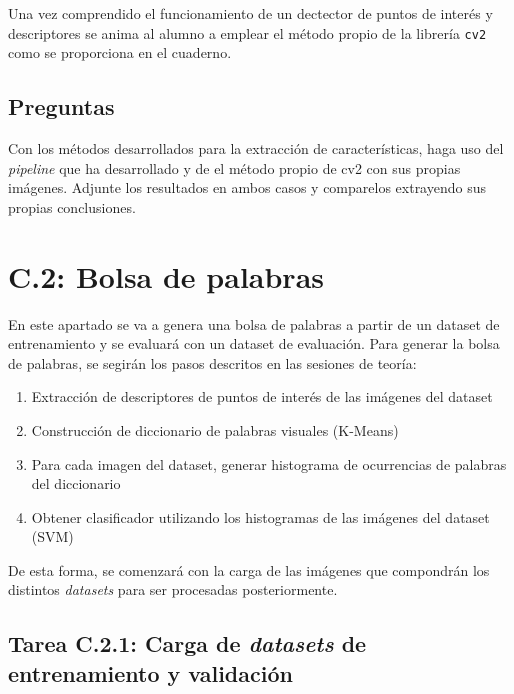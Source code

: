 Una vez comprendido el funcionamiento de un dectector de puntos de interés y descriptores se anima al alumno a emplear el método propio de la librería \texttt{cv2} como se proporciona en el cuaderno.


\subsection*{Preguntas}

\vspace{5mm}
\begin{tcolorbox}[colback=gray!10, colframe=gray!30, coltitle=black, title=Pregunta C.1: Correspodencia de imágenes propias y evaluación, halign=left]
Con los métodos desarrollados para la extracción de características, haga uso del \textit{pipeline} que ha desarrollado y de el método propio de cv2 con sus propias imágenes. Adjunte los resultados en ambos casos y comparelos extrayendo sus propias conclusiones.
\end{tcolorbox}

\section*{C.2: Bolsa de palabras}
{}

En este apartado se va a genera una bolsa de palabras a partir de un dataset de entrenamiento y se evaluará con un dataset de evaluación. Para generar la bolsa de palabras, se segirán los pasos descritos en las sesiones de teoría:

\begin{enumerate}
    \item Extracción de descriptores de puntos de interés de las imágenes del dataset
    \item Construcción de diccionario de palabras visuales (K-Means)
    \item Para cada imagen del dataset, generar histograma de ocurrencias de palabras del diccionario
    \item Obtener clasificador utilizando los histogramas de las imágenes del dataset (SVM)
\end{enumerate}

De esta forma, se comenzará con la carga de las imágenes que compondrán los distintos \textit{datasets} para ser procesadas posteriormente.

\subsection*{Tarea C.2.1: Carga de \textit{datasets} de entrenamiento y validación}

